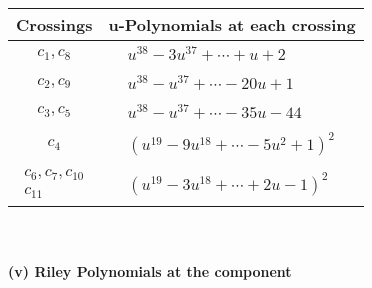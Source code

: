 \documentclass[1p]{elsarticle_modified}
\theoremstyle{definition}
\begin{document}
\begin{tabular}{m{50pt}|m{274pt}}
Crossings & \hspace{64pt}u-Polynomials at each crossing \\
\hline $$\begin{aligned}c_{1},c_{8}\end{aligned}$$&$\begin{aligned}
&u^{38}-3 u^{37}+\cdots+u+2
\end{aligned}$\\
\hline $$\begin{aligned}c_{2},c_{9}\end{aligned}$$&$\begin{aligned}
&u^{38}- u^{37}+\cdots-20 u+1
\end{aligned}$\\
\hline $$\begin{aligned}c_{3},c_{5}\end{aligned}$$&$\begin{aligned}
&u^{38}- u^{37}+\cdots-35 u-44
\end{aligned}$\\
\hline $$\begin{aligned}c_{4}\end{aligned}$$&$\begin{aligned}
&(u^{19}-9 u^{18}+\cdots-5 u^2+1)^{2}
\end{aligned}$\\
\hline $$\begin{aligned}c_{6},c_{7},c_{10}\\c_{11}\end{aligned}$$&$\begin{aligned}
&(u^{19}-3 u^{18}+\cdots+2 u-1)^{2}
\end{aligned}$\\
\hline
\end{tabular}\\~\\
\newpage\renewcommand{\arraystretch}{1}
\flushleft \textbf{(v) Riley Polynomials at the component}\newline \\
\end{document}
